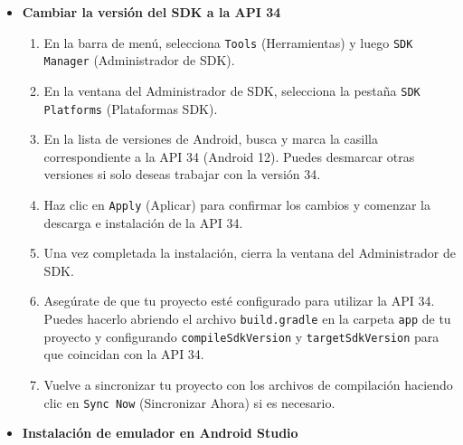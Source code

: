 \documentclass{article}
\begin{document}
\begin{itemize}
        \item \textbf{Cambiar la versión del SDK a la API 34}
            \begin{enumerate}
                \item En la barra de menú, selecciona \texttt{Tools} (Herramientas) y luego \texttt{SDK Manager} (Administrador de SDK).
                \item En la ventana del Administrador de SDK, selecciona la pestaña \texttt{SDK Platforms} (Plataformas SDK).
                \item En la lista de versiones de Android, busca y marca la casilla correspondiente a la API 34 (Android 12). Puedes desmarcar otras versiones si solo deseas trabajar con la versión 34.
                \item Haz clic en \texttt{Apply} (Aplicar) para confirmar los cambios y comenzar la descarga e instalación de la API 34.
                \item Una vez completada la instalación, cierra la ventana del Administrador de SDK.
                \item Asegúrate de que tu proyecto esté configurado para utilizar la API 34. Puedes hacerlo abriendo el archivo \texttt{build.gradle} en la carpeta \texttt{app} de tu proyecto y configurando \texttt{compileSdkVersion} y \texttt{targetSdkVersion} para que coincidan con la API 34.
                \item Vuelve a sincronizar tu proyecto con los archivos de compilación haciendo clic en \texttt{Sync Now} (Sincronizar Ahora) si es necesario.
            \end{enumerate}

        \item \textbf{Instalación de emulador en Android Studio}


\end{itemize}
\end{document}
